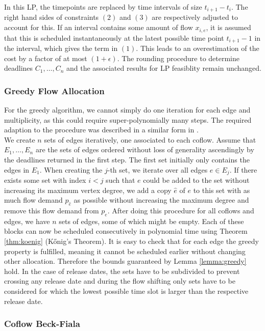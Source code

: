 \documentclass[11pt]{article}
\begin{document}
In this LP, the timepoints are replaced by time intervals of size $t_{i+1} - t_i$. The right hand sides of constraints $(2)$ and $(3)$ are respectively adjusted to account for this. If an interval contains some amount of flow $x_{i,e}$, it is assumed that this is scheduled instantaneously at the latest possible time point $t_{i+1}-1$ in the interval, which gives the term in $(1)$. This leads to an overestimation of the cost by a factor of at most $(1+\epsilon)$. The rounding procedure to determine deadlines $C_1,\dotsc,C_n$ and the associated results for LP feasiblity remain unchanged.

\subsubsection*{Greedy Flow Allocation}

For the greedy algorithm, we cannot simply do one iteration for each edge and multiplicity, as this could require super-polynomially many steps. The required adaption to the procedure was described in a similar form in \cite{zhen_2015}.\\

We create $n$ sets of edges iteratively, one associated to each coflow. Assume that $E_1,\dotsc,E_n$ are the sets of edges ordered without loss of generality ascendingly by the deadlines returned in the first step. The first set initially only contains the edges in $E_1$. When creating the $j$-th set, we iterate over all edges $e \in E_j$. If there exists some set with index $i < j$ such that $e$ could be added to the set without increasing its maximum vertex degree, we add a copy $\hat{e}$ of $e$ to this set with as much flow demand $p_{\hat{e}}$ as possible without increasing the maximum degree and remove this flow demand from $p_e$. After doing this procedure for all coflows and edges, we have $n$ sets of edges, some of which might be empty. Each of these blocks can now be scheduled consecutively in polynomial time using Theorem \ref{thm:koenig} (Kőnig's Theorem). It is easy to check that for each edge the greedy property is fulfilled, meaning it cannot be scheduled earlier without changing other allocation. Therefore the bounds guaranteed by Lemma \ref{lemma:greedy} hold. In the case of release dates, the sets have to be subdivided to prevent crossing any release date and during the flow shifting only sets have to be considered for which the lowest possible time slot is larger than the respective release date.

\subsubsection*{Coflow Beck-Fiala}
\end{document}
